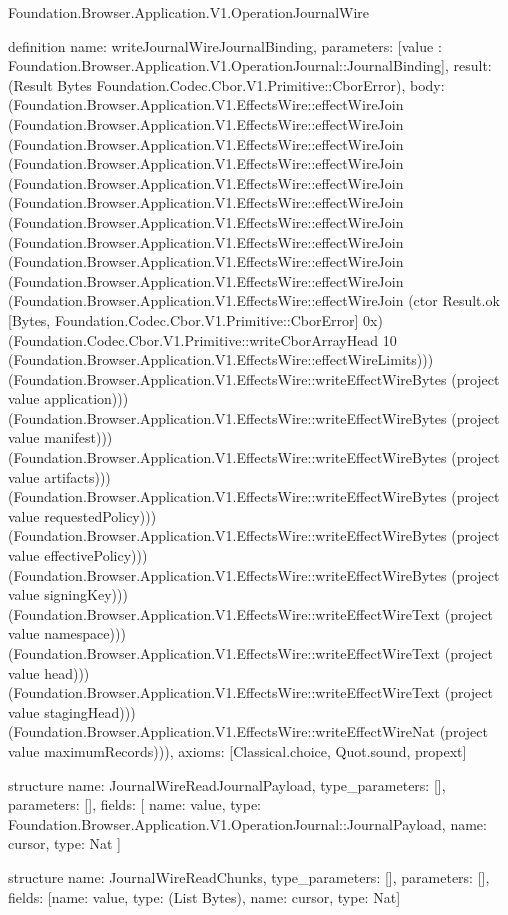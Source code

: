 \begin{lexlean}{Foundation.Browser.Application.V1.OperationJournalWire}
\begin{semanticmodule}
definition{
  name: writeJournalWireJournalBinding,
  parameters: [value : Foundation.Browser.Application.V1.OperationJournal::JournalBinding],
  result: (Result Bytes Foundation.Codec.Cbor.V1.Primitive::CborError),
  body: (Foundation.Browser.Application.V1.EffectsWire::effectWireJoin (Foundation.Browser.Application.V1.EffectsWire::effectWireJoin (Foundation.Browser.Application.V1.EffectsWire::effectWireJoin (Foundation.Browser.Application.V1.EffectsWire::effectWireJoin (Foundation.Browser.Application.V1.EffectsWire::effectWireJoin (Foundation.Browser.Application.V1.EffectsWire::effectWireJoin (Foundation.Browser.Application.V1.EffectsWire::effectWireJoin (Foundation.Browser.Application.V1.EffectsWire::effectWireJoin (Foundation.Browser.Application.V1.EffectsWire::effectWireJoin (Foundation.Browser.Application.V1.EffectsWire::effectWireJoin (Foundation.Browser.Application.V1.EffectsWire::effectWireJoin (ctor Result.ok [Bytes, Foundation.Codec.Cbor.V1.Primitive::CborError] 0x) (Foundation.Codec.Cbor.V1.Primitive::writeCborArrayHead 10 (Foundation.Browser.Application.V1.EffectsWire::effectWireLimits))) (Foundation.Browser.Application.V1.EffectsWire::writeEffectWireBytes (project value application))) (Foundation.Browser.Application.V1.EffectsWire::writeEffectWireBytes (project value manifest))) (Foundation.Browser.Application.V1.EffectsWire::writeEffectWireBytes (project value artifacts))) (Foundation.Browser.Application.V1.EffectsWire::writeEffectWireBytes (project value requestedPolicy))) (Foundation.Browser.Application.V1.EffectsWire::writeEffectWireBytes (project value effectivePolicy))) (Foundation.Browser.Application.V1.EffectsWire::writeEffectWireBytes (project value signingKey))) (Foundation.Browser.Application.V1.EffectsWire::writeEffectWireText (project value namespace))) (Foundation.Browser.Application.V1.EffectsWire::writeEffectWireText (project value head))) (Foundation.Browser.Application.V1.EffectsWire::writeEffectWireText (project value stagingHead))) (Foundation.Browser.Application.V1.EffectsWire::writeEffectWireNat (project value maximumRecords))),
  axioms: [Classical.choice, Quot.sound, propext]
}

structure{
  name: JournalWireReadJournalPayload,
  type_parameters: [],
  parameters: [],
  fields: [
    {name: value, type: Foundation.Browser.Application.V1.OperationJournal::JournalPayload},
    {name: cursor, type: Nat}
  ]
}

structure{
  name: JournalWireReadChunks,
  type_parameters: [],
  parameters: [],
  fields: [{name: value, type: (List Bytes)}, {name: cursor, type: Nat}]
}


\end{semanticmodule}
\end{lexlean}
